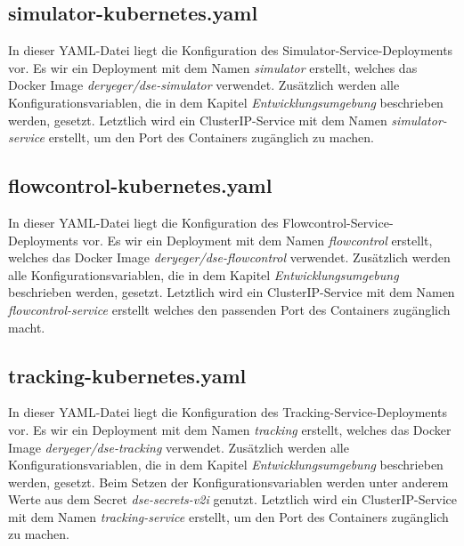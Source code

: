 \subsection{simulator-kubernetes.yaml}

In dieser YAML-Datei liegt die Konfiguration des Simulator-Service-Deployments vor.
Es wir ein Deployment mit dem Namen \textit{simulator} erstellt, welches das Docker Image \textit{deryeger/dse-simulator} verwendet.
Zusätzlich werden alle Konfigurationsvariablen, die in dem Kapitel \textit{Entwicklungsumgebung} beschrieben werden, gesetzt. 
Letztlich wird ein ClusterIP-Service mit dem Namen \textit{simulator-service} erstellt, um den Port des Containers zugänglich zu machen.

\subsection{flowcontrol-kubernetes.yaml}

In dieser YAML-Datei liegt die Konfiguration des Flowcontrol-Service-Deployments vor.
Es wir ein Deployment mit dem Namen \textit{flowcontrol} erstellt, welches das Docker Image \textit{deryeger/dse-flowcontrol} verwendet.
Zusätzlich werden alle Konfigurationsvariablen, die in dem Kapitel \textit{Entwicklungsumgebung} beschrieben werden, gesetzt. 
Letztlich wird ein ClusterIP-Service mit dem Namen \textit{flowcontrol-service} erstellt welches den passenden Port des Containers zugänglich macht.

\subsection{tracking-kubernetes.yaml}

In dieser YAML-Datei liegt die Konfiguration des Tracking-Service-Deployments vor.
Es wir ein Deployment mit dem Namen \textit{tracking} erstellt, welches das Docker Image \textit{deryeger/dse-tracking} verwendet.
Zusätzlich werden alle Konfigurationsvariablen, die in dem Kapitel \textit{Entwicklungsumgebung} beschrieben werden, gesetzt. 
Beim Setzen der Konfigurationsvariablen werden unter anderem Werte aus dem Secret \textit{dse-secrets-v2i} genutzt.
Letztlich wird ein ClusterIP-Service mit dem Namen \textit{tracking-service} erstellt, um den Port des Containers zugänglich zu machen.
